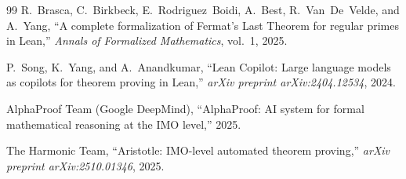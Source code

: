 \documentclass[11pt]{article}
\theoremstyle{definition}
\theoremstyle{remark}
\begin{document}
\begin{thebibliography}{99}
R.~Brasca, C.~Birkbeck, E.~Rodriguez~Boidi, A.~Best, R.~Van~De~Velde, and A.~Yang, ``A complete formalization of Fermat's Last Theorem for regular primes in Lean,'' \emph{Annals of Formalized Mathematics}, vol.~1, 2025.

P.~Song, K.~Yang, and A.~Anandkumar, ``Lean Copilot: Large language models as copilots for theorem proving in Lean,'' \emph{arXiv preprint arXiv:2404.12534}, 2024.

AlphaProof Team (Google DeepMind), ``AlphaProof: AI system for formal mathematical reasoning at the IMO level,'' 2025.

The Harmonic Team, ``Aristotle: IMO-level automated theorem proving,'' \emph{arXiv preprint arXiv:2510.01346}, 2025.
\end{thebibliography}
\end{document}
